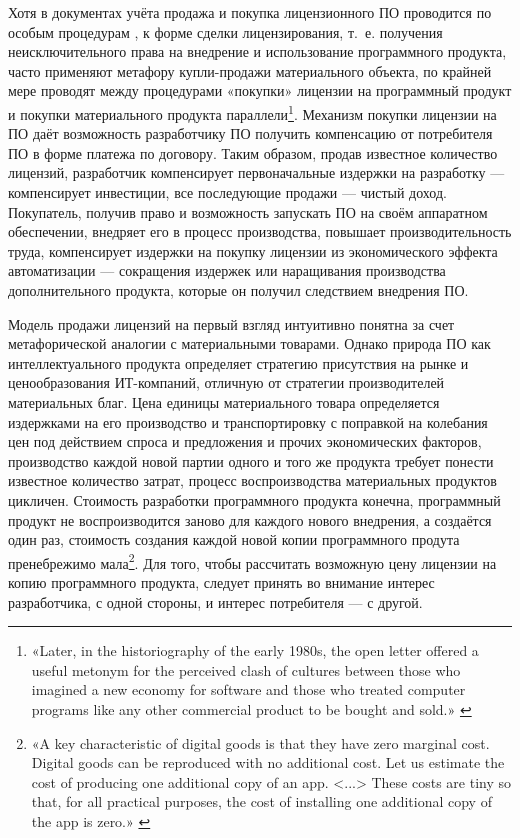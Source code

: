 \documentclass{article}
\begin{document}
Хотя в документах учёта продажа и покупка лицензионного ПО проводится по особым процедурам \cite{accountingIAS, accountingNKRF257, accountingNKRF264}, к форме сделки лицензирования, т.~е. получения неисключительного права на внедрение и использование программного продукта, часто применяют метафору купли-продажи материального объекта, по крайней мере проводят между процедурами «покупки» лицензии на программный продукт и покупки материального продукта параллели\footnote{«Later, in the historiography of the early 1980s, the open letter offered a useful metonym for the perceived clash of cultures between those who imagined a new economy for software and those who treated computer programs like any other commercial product to be bought and sold.» \cite{driscollOpenLetter}}. Механизм покупки лицензии на ПО даёт возможность разработчику ПО получить компенсацию от потребителя ПО в форме платежа по договору. Таким образом, продав известное количество лицензий, разработчик компенсирует первоначальные издержки на разработку — компенсирует инвестиции, все последующие продажи — чистый доход. Покупатель, получив право и возможность запускать ПО на своём аппаратном обеспечении, внедряет его в процесс производства, повышает производительность труда, компенсирует издержки на покупку лицензии из экономического эффекта автоматизации — сокращения издержек или наращивания производства дополнительного продукта, которые он получил следствием внедрения ПО.

Модель продажи лицензий на первый взгляд интуитивно понятна за счет метафорической аналогии с материальными товарами. Однако природа ПО как интеллектуального продукта определяет стратегию присутствия на рынке и ценообразования ИТ-компаний, отличную от стратегии производителей материальных благ. Цена единицы материального товара определяется издержками на его производство и транспортировку с поправкой на колебания цен под действием спроса и предложения и прочих экономических факторов, производство каждой новой партии одного и того же продукта требует понести известное количество затрат, процесс воспроизводства материальных продуктов цикличен. Стоимость разработки программного продукта конечна, программный продукт не воспроизводится заново для каждого нового внедрения, а создаётся один раз, стоимость создания каждой новой копии программного продута пренебрежимо мала\footnote{«A key characteristic of digital goods is that they have zero marginal cost. Digital goods can be reproduced with no additional cost. Let us estimate the cost of producing one additional copy of an app. <...> These costs are tiny so that, for all practical purposes, the cost of installing one additional copy of the app is zero.» \cite{introToDigital}}. Для того, чтобы рассчитать возможную цену лицензии на копию программного продукта, следует принять во внимание интерес разработчика, с одной стороны, и интерес потребителя — с другой.
\end{document}
